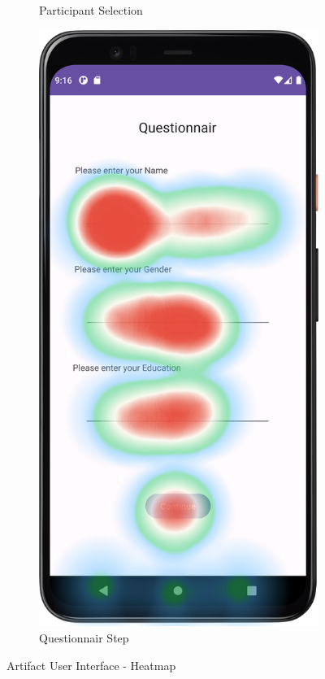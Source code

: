 \begin{figure}[htbp]
\begin{subfigure}[b]{0.25\textwidth}
        \caption{Participant Selection}
        \label{subfig:heatmapB}
    \end{subfigure}
        \hspace{1cm}
    \begin{subfigure}[b]{0.25\textwidth}
        \centering
        \includegraphics[width=\textwidth]{content/07_evaluation_of_the_solution/HeatMap_QuestionnairScreen.png}
        \caption{Questionnair Step}
        \label{subfig:heatmapC}
    \end{subfigure}
       \caption{Artifact User Interface - Heatmap}
       \label{fig:heatmaps}
\end{figure}

